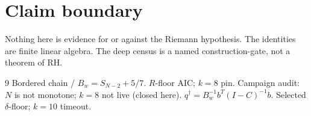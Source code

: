 \documentclass[11pt]{article}
\newcommand{\qd}{q^{\dagger}}
\begin{document}
\section*{Claim boundary}

Nothing here is evidence for or against the Riemann
hypothesis.
The identities are finite linear algebra.
The deep census is a named construction-gate,
not a theorem of RH.

\begin{thebibliography}{9}
 Bordered chain / $B_w=S_{N-2}+5/7$.
 $R$-floor AIC; $k=8$ pin.
 Campaign audit: $N$ is not monotone;
$k=8$ not live (closed here).
 $\qd=B_w^{-1}b^{T}(I-C)^{-1}b$.
 Selected $\delta$-floor; $k=10$ timeout.
\end{thebibliography}
\end{document}
